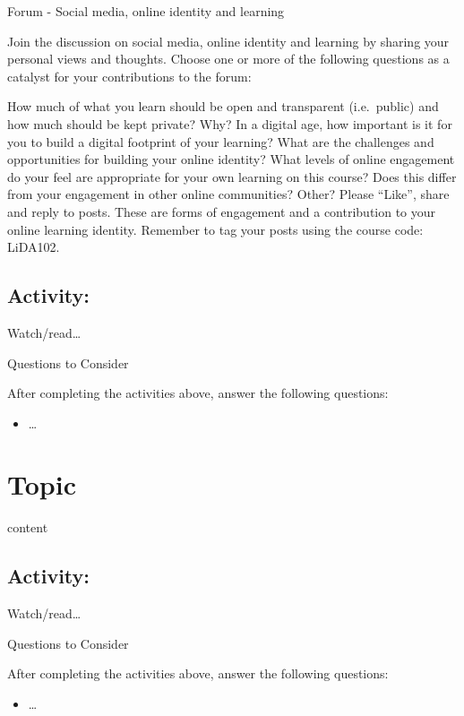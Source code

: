 \documentclass[
]{book}
\providecommand{\tightlist}{%
  \setlength{\itemsep}{0pt}\setlength{\parskip}{0pt}}
\theoremstyle{definition}
\theoremstyle{definition}
\theoremstyle{definition}
\theoremstyle{definition}
\theoremstyle{remark}
\begin{document}
Forum - Social media, online identity and learning

Join the discussion on social media, online identity and learning by sharing your personal views and thoughts. Choose one or more of the following questions as a catalyst for your contributions to the forum:

How much of what you learn should be open and transparent (i.e.~public) and how much should be kept private? Why?
In a digital age, how important is it for you to build a digital footprint of your learning?
What are the challenges and opportunities for building your online identity?
What levels of online engagement do your feel are appropriate for your own learning on this course? Does this differ from your engagement in other online communities?
Other?
Please ``Like'', share and reply to posts. These are forms of engagement and a contribution to your online learning identity. Remember to tag your posts using the course code: LiDA102.

\hypertarget{activity-11}{%
\subsection*{Activity:}\label{activity-11}}

\begin{reflect}
Watch/read\ldots{}

{Questions to Consider}

After completing the activities above, answer the following questions:

\begin{itemize}
\tightlist
\item
  \ldots{}
\end{itemize}
\end{reflect}

\hypertarget{topic-8}{%
\section{Topic}\label{topic-8}}

content

\hypertarget{activity-12}{%
\subsection*{Activity:}\label{activity-12}}

\begin{reflect}
Watch/read\ldots{}

{Questions to Consider}

After completing the activities above, answer the following questions:

\begin{itemize}
\tightlist
\item
  \ldots{}
\end{itemize}
\end{reflect}
\end{document}
